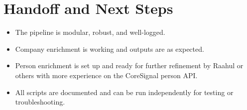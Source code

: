 \documentclass{article}
\begin{document}
\section{Handoff and Next Steps}
\begin{itemize}
  \item The pipeline is modular, robust, and well-logged.
  \item Company enrichment is working and outputs are as expected.
  \item Person enrichment is set up and ready for further refinement by Raahul or others with more experience on the CoreSignal person API.
  \item All scripts are documented and can be run independently for testing or troubleshooting.
\end{itemize}
\end{document}
